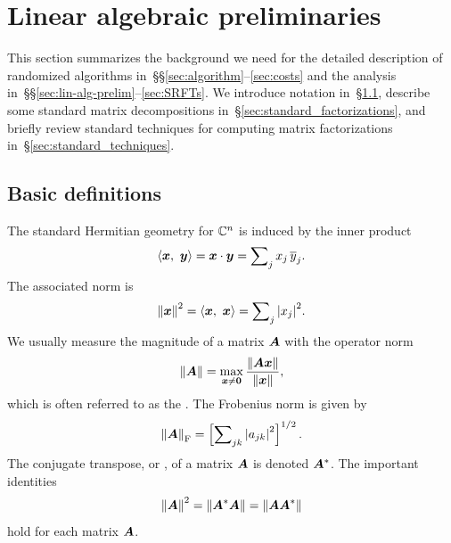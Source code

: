 \documentclass[final]{siamltex}
\newcounter{algorithm}[section]
\begin{document}


\section{Linear algebraic preliminaries}
\label{sec:LA_prel}

This section summarizes the background we need
for the detailed description of randomized algorithms
in~\S\S\ref{sec:algorithm}--\ref{sec:costs} and
the analysis in~\S\S\ref{sec:lin-alg-prelim}--\ref{sec:SRFTs}.
We introduce notation in~\S\ref{sec:basic_def}, describe some standard matrix decompositions
in~\S\ref{sec:standard_factorizations}, and briefly review
standard techniques for computing matrix factorizations
in~\S\ref{sec:standard_techniques}.




\subsection{Basic definitions}
\label{sec:basic_def}
The standard Hermitian geometry for $\mathbb{C}^{n}$ is induced by the inner product
$$
\left\langle { \bm{x} },\ { \bm{y} } \right\rangle = \bm{x} \cdot \bm{y} =  \sum\nolimits_{j} x_j\, \overline{y}_j.
$$
The associated norm is
$$
\left\Vert { \bm{x} } \right\Vert^2 = \left\langle { \bm{x} },\ { \bm{x} } \right\rangle
    = \sum\nolimits_{j} {\left\vert {x_j} \right\vert}^2.
$$
We usually measure the magnitude of a matrix $\bm{A}$
with the operator norm
$$
\left\Vert {\bm{A}} \right\Vert = \max_{\bm{x} \neq \bm{0}}
\frac{\left\Vert {\bm{A}\bm{x}} \right\Vert}{\left\Vert {\bm{x}} \right\Vert},
$$
which is often referred to as the .
The Frobenius norm is given by
$$
\left\Vert {\bm{A}} \right\Vert_{\mathrm{F}} = \left[ \sum\nolimits_{jk} {\left\vert {a_{jk}} \right\vert}^2 \right]^{1/2}.
$$
The conjugate transpose, or , of a matrix $\bm{A}$ is
denoted $\bm{A}^{*}$.  The important identities
$$
\left\Vert {\bm{A}} \right\Vert^2 = \left\Vert {\bm{A}^*\bm{A}} \right\Vert = \left\Vert {\bm{AA}^*} \right\Vert
$$
hold for each matrix $\bm{A}$.
\end{document}
